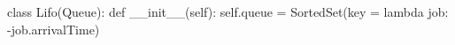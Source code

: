 
class Lifo(Queue):
    def __init__(self):
        self.queue = SortedSet(key = lambda job: -job.arrivalTime)

